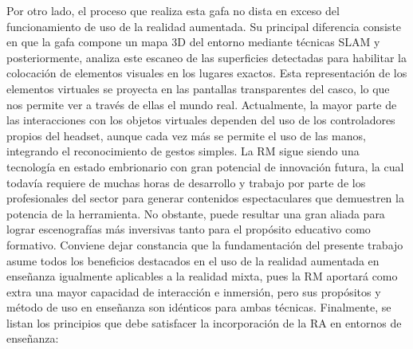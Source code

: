 Por otro lado, el proceso que realiza esta gafa no dista en exceso del funcionamiento de uso de la realidad aumentada. Su principal diferencia consiste en que la gafa compone un mapa 3D del entorno mediante técnicas SLAM y posteriormente, analiza este escaneo de las superficies detectadas para habilitar la colocación de elementos visuales en los lugares exactos. Esta representación de los elementos virtuales se proyecta en las pantallas transparentes del casco, lo que nos permite ver a través de ellas el mundo real. Actualmente, la mayor parte de las interacciones con los objetos virtuales dependen del uso de los controladores propios del headset, aunque cada vez más se permite el uso de las manos, integrando el reconocimiento de gestos simples.
La RM sigue siendo una tecnología en estado embrionario con gran potencial de innovación futura, la cual todavía requiere de muchas horas de desarrollo y trabajo por parte de los profesionales del sector para generar contenidos espectaculares que demuestren la potencia de la herramienta. No obstante, puede resultar una gran aliada para lograr escenografías más inversivas tanto para el propósito educativo como formativo.
Conviene dejar constancia que la fundamentación del presente trabajo asume todos los beneficios destacados en el uso de la realidad aumentada en enseñanza igualmente aplicables a la realidad mixta, pues la RM aportará como extra una mayor capacidad de interacción e inmersión, pero sus propósitos y método de uso en enseñanza son idénticos para ambas técnicas. Finalmente, se listan los principios que debe satisfacer la incorporación de la RA en entornos de enseñanza:

